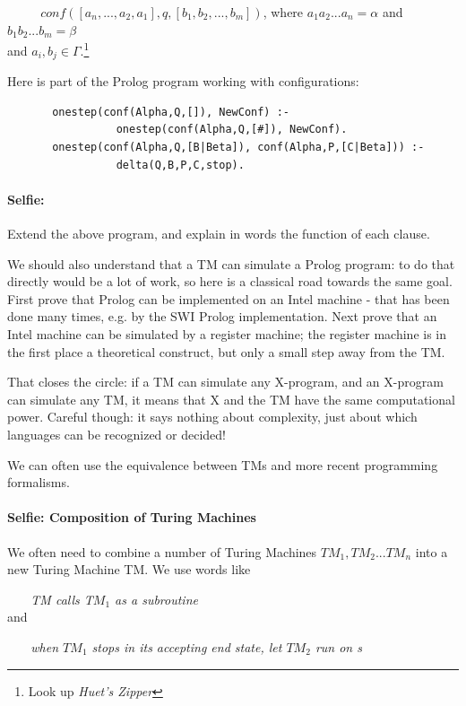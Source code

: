 $~~~~~~~~~~~~conf([a_n, ... , a_2,a_1],q,[b_1,b_2,...,b_m])$, where
$a_1a_2...a_n = \alpha$ and $b_1b_2...b_m = \beta$
%
\\ and $a_i, b_j \in \Gamma$.\footnote{Look up {\em Huet's Zipper}}

Here is part of the Prolog program working with configurations:

\begin{verbatim}
       onestep(conf(Alpha,Q,[]), NewConf) :-
                 onestep(conf(Alpha,Q,[#]), NewConf).
       onestep(conf(Alpha,Q,[B|Beta]), conf(Alpha,P,[C|Beta])) :-
                 delta(Q,B,P,C,stop).
\end{verbatim}

\paragraph{Selfie:} Extend the above program, and explain in words the function of each clause.


We should also understand that a TM can simulate a Prolog program: to
do that directly would be a lot of work, so here is a classical road
towards the same goal. First prove that Prolog can be implemented on
an Intel machine - that has been done many times, e.g. by the SWI
Prolog implementation. Next prove that an Intel machine can be
simulated by a register machine; the register machine is in the first
place a theoretical construct, but only a small step away from the TM.

That closes the circle: if a TM can simulate any X-program, and an
X-program can simulate any TM, it means that X and the TM have the
same computational power. Careful though: it says nothing about
complexity, just about which languages can be recognized or decided!

We can often use the equivalence between TMs and more recent
programming formalisms.



\paragraph{Selfie: Composition of Turing Machines}

We often need to combine a number of Turing Machines $TM_1, TM_2
... TM_n$ into a new Turing Machine TM. We use words like

$~~~~~~~$ {\em TM calls T$M_1$ as a subroutine}\\
and

$~~~~~~~$ {\em when $TM_1$ stops in its accepting end state,
let $TM_2$ run on s}



